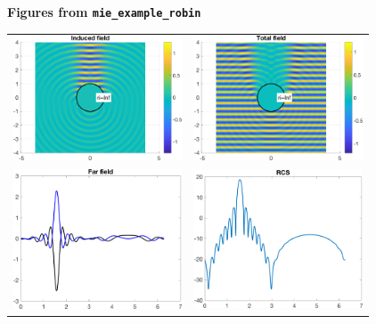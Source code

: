 \documentclass[11pt,letterpaper]{article}
\newcommand{\techheading}[1]{%
    \par\vspace{-0.3\parskip}\noindent\hspace{-1cm}\textbf{#1}%
    \par\vspace{-0.5\parskip}\noindent\nopagebreak\ignorespaces}
\begin{document}
\newpage 
\techheading{Figures from \texttt{mie\_example\_robin}}
\begin{center}
  \begin{tabular}{cc}
    \includegraphics[width=5cm]{mie_example_robin_figure1.png}
    &
    \includegraphics[width=5cm]{mie_example_robin_figure2.png}\\
    \includegraphics[width=5cm]{mie_example_robin_figure3.png}
    &
    \includegraphics[width=5cm]{mie_example_robin_figure4.png}
  \end{tabular}
\end{center}
\end{document}
